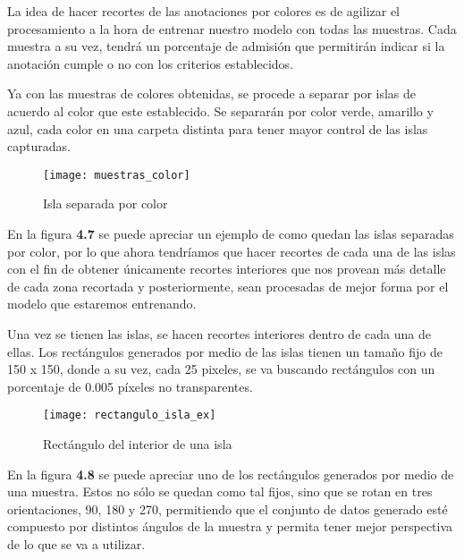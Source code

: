 La idea de hacer recortes de las anotaciones por colores es de agilizar el procesamiento a la hora de entrenar nuestro modelo con todas las muestras. Cada muestra a su vez, tendrá un porcentaje de admisión que permitirán indicar si la anotación cumple o no con los criterios establecidos.

Ya con las muestras de colores obtenidas, se procede a separar por islas de acuerdo al color que este establecido. Se separarán por color verde, amarillo y azul, cada color en una carpeta distinta para tener mayor control de las islas capturadas.

\begin{figure}[H]
  \centering
  \begin{minipage}[b]{0.5\textwidth}
        \texttt{[image: muestras\_color]}
    \caption{Isla separada por color}
  \end{minipage}
\end{figure}

En la figura \textbf{4.7} se puede apreciar un ejemplo de como quedan las islas separadas por color, por lo que ahora tendríamos que hacer recortes de cada una de las islas con el fin de obtener únicamente recortes interiores que nos provean más detalle de cada zona recortada y posteriormente, sean procesadas de mejor forma por el modelo que estaremos entrenando. \\

\break

Una vez se tienen las islas, se hacen recortes interiores dentro de cada una de ellas. Los rectángulos generados por medio de las islas tienen un tamaño fijo de 150 x 150, donde a su vez, cada 25 pixeles, se va buscando rectángulos con un porcentaje de 0.005 píxeles no transparentes.


\begin{figure}[h]
  \centering
  \begin{minipage}[b]{0.7\textwidth}
        \texttt{[image: rectangulo\_isla\_ex]}
    \caption{Rectángulo del interior de una isla}
  \end{minipage}
\end{figure}


En la figura \textbf{4.8} se puede apreciar uno de los rectángulos generados por medio de una muestra. Estos no sólo se quedan como tal fijos, sino que se rotan en tres orientaciones, 90, 180 y 270, permitiendo que el conjunto de datos generado esté compuesto por distintos ángulos de la muestra y permita tener mejor perspectiva de lo que se va a utilizar.

